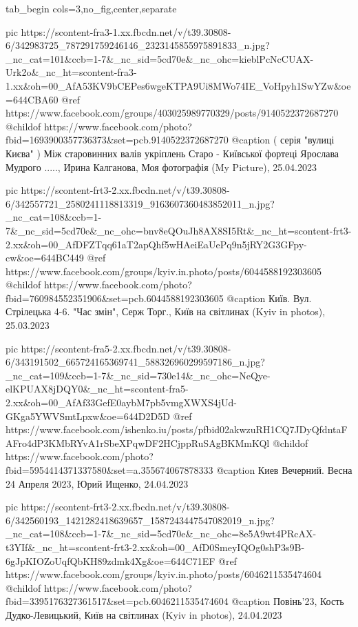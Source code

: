  
 
 
 
 

\ifcmt
  tab_begin cols=3,no_fig,center,separate

    pic https://scontent-fra3-1.xx.fbcdn.net/v/t39.30808-6/342983725_787291759246146_2323145855975891833_n.jpg?_nc_cat=101&ccb=1-7&_nc_sid=5cd70e&_nc_ohc=kieblPcNcCUAX-Urk2o&_nc_ht=scontent-fra3-1.xx&oh=00_AfA53KV9bCEPes6wgeKTPA9Ui8MWo74IE_VoHpyh1SwYZw&oe=644CBA60
    @ref https://www.facebook.com/groups/403025989770329/posts/9140522372687270
    @childof https://www.facebook.com/photo?fbid=1693900357736373&set=pcb.9140522372687270
    @caption ( серія "вулиці Києва" ) Між старовинних валів укріплень Старо - Київської фортеці Ярослава Мудрого ....., Ирина Калганова, Моя фотографія (My Picture), 25.04.2023

    pic https://scontent-frt3-2.xx.fbcdn.net/v/t39.30808-6/342557721_2580241118813319_9163607360483852011_n.jpg?_nc_cat=108&ccb=1-7&_nc_sid=5cd70e&_nc_ohc=bnv8eQOuJh8AX8SI5Rt&_nc_ht=scontent-frt3-2.xx&oh=00_AfDFZTqq61aT2apQhf5wHAeiEaUePq9n5jRY2G3GFpy-cw&oe=644BC449
    @ref https://www.facebook.com/groups/kyiv.in.photo/posts/6044588192303605
    @childof https://www.facebook.com/photo?fbid=760984552351906&set=pcb.6044588192303605
    @caption Київ. Вул. Стрілецька 4-6. "Час змін", Серж Торг., Київ на світлинах (Kyiv in photos), 25.03.2023

    pic https://scontent-fra5-2.xx.fbcdn.net/v/t39.30808-6/343191502_665724165369741_588326960299597186_n.jpg?_nc_cat=109&ccb=1-7&_nc_sid=730e14&_nc_ohc=NeQye-elKPUAX8jDQY0&_nc_ht=scontent-fra5-2.xx&oh=00_AfAf33GefE0aybM7pb5vmgXWXS4jUd-GKga5YWVSmtLpxw&oe=644D2D5D
    @ref https://www.facebook.com/ishenko.iu/posts/pfbid02akwzuRH1CQ7JDyQfdntaFAFro4dP3KMbRYvA1rSbeXPqwDF2HCjppRuSAgBKMmKQl
    @childof https://www.facebook.com/photo?fbid=5954414371337580&set=a.355674067878333
    @caption Киев Вечерний. Весна 24 Апреля 2023, Юрий Ищенко, 24.04.2023

    pic https://scontent-frt3-2.xx.fbcdn.net/v/t39.30808-6/342560193_1421282418639657_1587243447547082019_n.jpg?_nc_cat=108&ccb=1-7&_nc_sid=5cd70e&_nc_ohc=8e5A9wt4PRcAX-t3YIf&_nc_ht=scontent-frt3-2.xx&oh=00_AfD0SmeyIQOg0shP3s9B-6gJpKIOZoUqfQbKH89zdmk4Xg&oe=644C71EF
    @ref https://www.facebook.com/groups/kyiv.in.photo/posts/6046211535474604
    @childof https://www.facebook.com/photo?fbid=3395176327361517&set=pcb.6046211535474604
    @caption Повінь'23, Кость Дудко-Левицький, Київ на світлинах (Kyiv in photos), 24.04.2023

